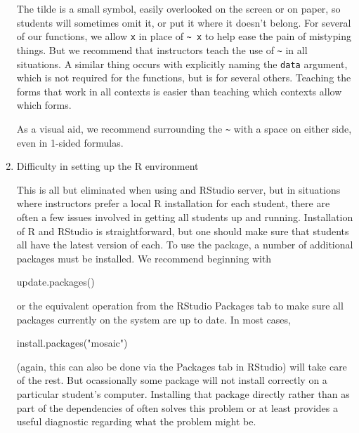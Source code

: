 \begin{enumerate}
  The tilde is a small symbol, easily overlooked on the screen or on
  paper, so students will sometimes omit it, or put it where it doesn't
  belong. For several of our functions, we allow \texttt{x} in place of
  \texttt{\textasciitilde{}\ x} to help ease the pain of mistyping
  things. But we recommend that instructors teach the use of
  \texttt{\textasciitilde{}} in all situations. A similar thing occurs
  with explicitly naming the \texttt{data} argument, which is not
  required for the  functions, but is for several others.
  Teaching the forms that work in all contexts is easier than teaching
  which contexts allow which forms.

  As a visual aid, we recommend surrounding the
  \texttt{\textasciitilde{}} with a space on either side, even in
  1-sided formulas.
\item
  Difficulty in setting up the R environment

  This is all but eliminated when using and RStudio server, but in
  situations where instructors prefer a local R installation for each
  student, there are often a few issues involved in getting all students
  up and running. Installation of R and RStudio is straightforward, but
  one should make sure that students all have the latest version of
  each. To use the  package, a number of additional packages
  must be installed. We recommend beginning with

  \begin{Schunk}
  \begin{Sinput}
  update.packages()
  \end{Sinput}
  \end{Schunk}

  or the equivalent operation from the RStudio Packages tab to make sure
  all packages currently on the system are up to date. In most cases,

  \begin{Schunk}
  \begin{Sinput}
  install.packages("mosaic")
  \end{Sinput}
  \end{Schunk}

  (again, this can also be done via the Packages tab in RStudio) will
  take care of the rest. But ocassionally some package will not install
  correctly on a particular student's computer. Installing that package
  directly rather than as part of the dependencies of  often
  solves this problem or at least provides a useful diagnostic regarding
  what the problem might be.
\end{enumerate}

